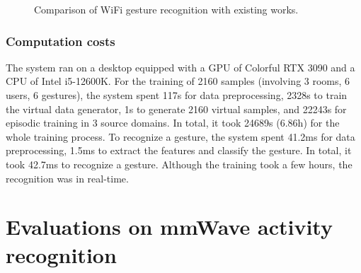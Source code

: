 \documentclass[journal]{IEEEtran}
\begin{document}
\begin{figure}
\begin{center}
\hspace{0.5cm}
\caption{Comparison of WiFi gesture recognition with existing works.}
\label{FigWiFiComparasion}
\end{center}
\end{figure}

\subsubsection{Computation costs}
The system ran on a desktop equipped with a GPU of Colorful RTX 3090 and a CPU of Intel i5-12600K. For the training of 2160 samples (involving 3 rooms, 6 users, 6 gestures), the system spent 117s for data preprocessing, 2328s to train the virtual data generator, 1s to generate 2160 virtual samples, and 22243s for episodic training in 3 source domains. In total, it took 24689s (6.86h) for the whole training process. To recognize a gesture, the system spent 41.2ms for data preprocessing, 1.5ms to extract the features and classify the gesture. In total, it took 42.7ms to recognize a gesture. Although the training took a few hours, the recognition was in real-time. 


\section{Evaluations on mmWave activity recognition}
\label{SecMmWave}
\end{document}
